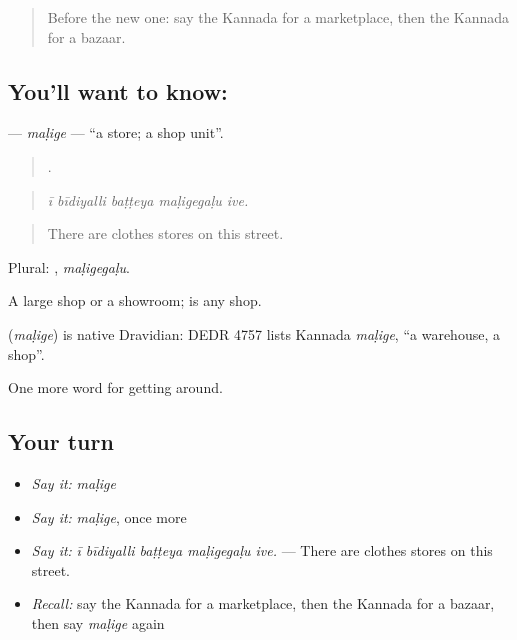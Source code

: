 \label{lesson:KA-C467-malige}



\begin{quote}
Before the new one: say the Kannada for a marketplace, then the Kannada for a bazaar.
\end{quote}

\subsection*{You'll want to know: }
\textbf{} — \emph{maḷige} — \textquotedblleft{}a store; a shop unit\textquotedblright{}.

\begin{quote}
    .
\end{quote}

\begin{quote}
\emph{ī bīdiyalli baṭṭeya maḷigegaḷu ive.}
\end{quote}

\begin{quote}
There are clothes stores on this street.
\end{quote}

Plural: , \emph{maḷigegaḷu}.

A large shop or a showroom;  is any shop.

\begin{cousinweb}
\textbf{} (\emph{maḷige}) is native Dravidian: DEDR 4757 lists Kannada \emph{maḷige}, \textquotedblleft{}a warehouse, a shop\textquotedblright{}.
\end{cousinweb}

\begin{grammarlens}[title={What you've built}]
One more word for getting around.
\end{grammarlens}

\subsection*{Your turn}
\begin{itemize}
\raggedright
  \item \emph{Say it:} \emph{maḷige}
  \item \emph{Say it:} \emph{maḷige}, once more
  \item \emph{Say it:} \emph{ī bīdiyalli baṭṭeya maḷigegaḷu ive.} — There are clothes stores on this street.
  \item \emph{Recall:} say the Kannada for a marketplace, then the Kannada for a bazaar, then say \emph{maḷige} again
\end{itemize}

